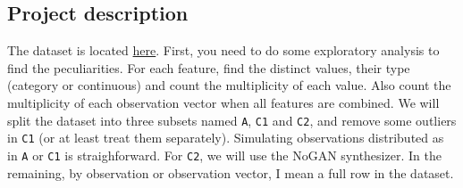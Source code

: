 \documentclass[oneside,10pt]{book}
\begin{document}
\subsection{Project description}

The dataset is located \href{https://raw.githubusercontent.com/VincentGranville/Main/main/iot_security.csv}{here}.
 First, you need to do some exploratory analysis to find the peculiarities. For each feature, find the distinct values, their type (category or continuous) and count the multiplicity of each value. Also count the multiplicity of each observation vector when all features
 are combined. We will split the dataset into three subsets named \texttt{A}, \texttt{C1} and \texttt{C2},
and remove some outliers in \texttt{C1} (or at least treat them separately). Simulating observations distributed as in
\texttt{A} or \texttt{C1} is straighforward.
 For \texttt{C2}, we will use the NoGAN synthesizer. In the remaining, by observation or observation vector, I mean a full row in the dataset.
\end{document}
